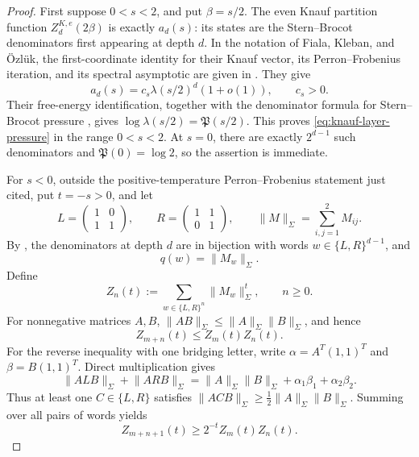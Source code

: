 \begin{proof}
First suppose \(0<s<2\), and put \(\beta=s/2\).  The even Knauf
partition function \(Z^{K,e}_d(2\beta)\) is exactly \(a_d(s)\): its
states are the Stern--Brocot denominators first appearing at depth \(d\).  In the
notation of Fiala, Kleban, and \"Ozl\"uk, the first-coordinate identity
for their Knauf vector, its Perron--Frobenius iteration, and its spectral
asymptotic are given in
\cite[Sec.~IV, especially Eqs.~(23), (26), and (28)]{FialaKlebanOzluk2003}.
They give
\[
 a_d(s)=c_s\lambda(s/2)^d(1+o(1)),\qquad c_s>0.
\]
Their free-energy identification, together with the denominator formula
for Stern--Brocot pressure
\cite[Thm.~1.1 and the denominator formula in Sec.~2]{KessebohmerStratmann2007},
gives \(\log\lambda(s/2)=\mathfrak P(s/2)\).  This proves
\eqref{eq:knauf-layer-pressure} in the range \(0<s<2\).  At \(s=0\),
there are exactly \(2^{d-1}\) such denominators and
\(\mathfrak P(0)=\log2\), so the assertion is immediate.

For \(s<0\), outside the positive-temperature Perron--Frobenius statement
just cited, put
\(t=-s>0\), and let
\[
 L=\begin{pmatrix}1&0\\1&1\end{pmatrix},\qquad
 R=\begin{pmatrix}1&1\\0&1\end{pmatrix},\qquad
 \lVert M\rVert_\Sigma=\sum_{i,j=1}^2M_{ij}.
\]
 By , the denominators at
 depth \(d\) are in bijection with words \(w\in\{L,R\}^{d-1}\), and
\begin{equation}
 q(w)=\lVert M_w\rVert_\Sigma.
 \label{eq:stern-brocot-matrix-denominator}
\end{equation}
Define
\[
 Z_n(t):=\sum_{w\in\{L,R\}^n}\lVert M_w\rVert_\Sigma^t,
 \qquad n\ge0.
\]
For nonnegative matrices \(A,B\),
\(\lVert AB\rVert_\Sigma\le
\lVert A\rVert_\Sigma\lVert B\rVert_\Sigma\), and hence
\begin{equation}
 Z_{m+n}(t)\le Z_m(t)Z_n(t).
 \label{eq:matrix-partition-submultiplicative}
\end{equation}
For the reverse inequality with one bridging letter, write
\(\alpha=A^T(1,1)^T\) and \(\beta=B(1,1)^T\).  Direct multiplication gives
\[
 \lVert ALB\rVert_\Sigma+\lVert ARB\rVert_\Sigma
 =\lVert A\rVert_\Sigma\lVert B\rVert_\Sigma
   +\alpha_1\beta_1+\alpha_2\beta_2.
\]
Thus at least one \(C\in\{L,R\}\) satisfies
\(\lVert ACB\rVert_\Sigma\ge
\frac12\lVert A\rVert_\Sigma\lVert B\rVert_\Sigma\).  Summing over
all pairs of words yields
\begin{equation}
 Z_{m+n+1}(t)\ge2^{-t}Z_m(t)Z_n(t).
 \label{eq:matrix-partition-bridged}
\end{equation}


\end{proof}
